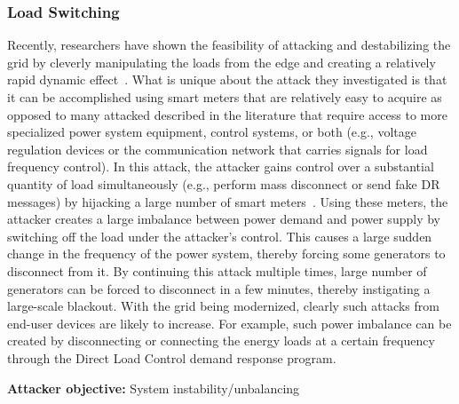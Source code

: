 \documentclass[conference]{IEEEtran}
\begin{document}
\subsubsection{Load Switching}
Recently, researchers have shown the feasibility of attacking and destabilizing the grid by cleverly manipulating the loads from the edge and creating a relatively rapid dynamic effect~\cite{Amini:ISGT2015}. What is unique about the attack they investigated is that it can be accomplished using smart meters that are relatively easy to acquire as opposed to many attacked described in the literature that require access to more specialized power system equipment, control systems, or both (e.g., voltage regulation devices or the communication network that carries signals for load frequency control). In this attack, the attacker gains control over a substantial quantity of load simultaneously (e.g., perform mass disconnect or send fake DR messages) by hijacking a large number of smart meters~\cite{Lee:NESCOR2013}. Using these meters, the attacker creates a large imbalance between power demand and power supply by switching off the load under the attacker's control. This causes a large sudden change in the frequency of the power system, thereby forcing some generators to disconnect from it. By continuing this attack multiple times, 
large number of generators can be forced to disconnect in a few minutes, thereby instigating a large-scale blackout. With the grid being modernized, clearly such attacks from end-user devices are likely to increase. 
For example, such power imbalance can be created by disconnecting or connecting the energy loads at a certain frequency through the Direct Load Control demand response program.

\textbf{Attacker objective:} System instability/unbalancing
\end{document}
